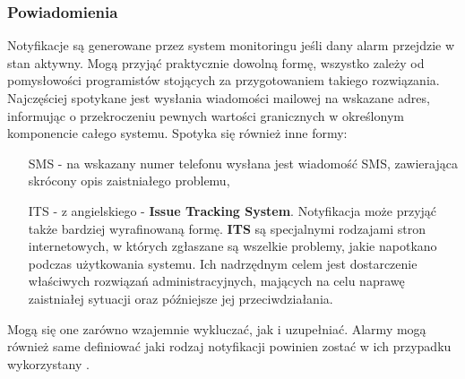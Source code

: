         \subsubsection{Powiadomienia}
        Notyfikacje są generowane przez system monitoringu jeśli dany alarm przejdzie w stan aktywny. Mogą przyjąć praktycznie
        dowolną formę, wszystko zależy od pomysłowości programistów stojących za przygotowaniem takiego rozwiązania.
        Najczęściej spotykane jest wysłania wiadomości mailowej na wskazane adres, informując o 
        przekroczeniu pewnych wartości granicznych w określonym komponencie całego systemu. Spotyka się również inne formy:
        \begin{itemize}
            \item[SMS] - na wskazany numer telefonu wysłana jest wiadomość SMS, zawierająca skrócony opis zaistniałego problemu,
            \item[ITS] - z angielskiego - \textbf{Issue Tracking System}. Notyfikacja może przyjąć także bardziej wyrafinowaną formę.
            \textbf{ITS} są specjalnymi rodzajami stron internetowych, w których zgłaszane są wszelkie problemy, jakie napotkano
            podczas użytkowania systemu. Ich nadrzędnym celem jest dostarczenie właściwych rozwiązań administracyjnych, mających
            na celu naprawę zaistniałej sytuacji oraz późniejsze jej przeciwdziałania.
        \end{itemize}
        Mogą się one zarówno wzajemnie wykluczać, jak i uzupełniać. Alarmy mogą również same definiować jaki rodzaj notyfikacji
        powinien zostać w ich przypadku wykorzystany \cite{monitoring_and_alerting}.
        
